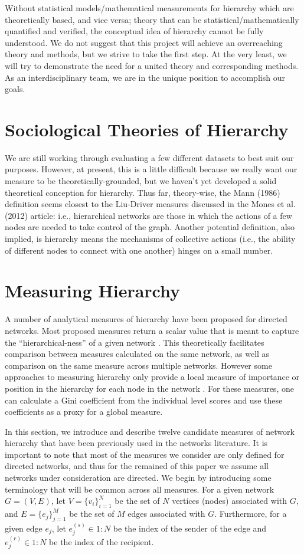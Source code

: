 \documentclass[3p,times]{elsarticle}
\begin{document}
Without statistical models/mathematical measurements for hierarchy which are theoretically based, and vice versa; theory that can be statistical/mathematically quantified and verified, the conceptual idea of hierarchy cannot be fully understood. We do not suggest that this project will achieve an overreaching theory and methods, but we strive to take the first step. At the very least, we will try to demonstrate the need for a united theory and corresponding methods. As an interdisciplinary team, we are in the unique position to accomplish our goals.
\section{Sociological Theories of Hierarchy}
	We are still working through evaluating a few different datasets to best suit our purposes. However, at present, this is a little difficult because we really want our measure to be theoretically-grounded, but we haven't yet developed a solid theoretical conception for hierarchy. Thus far, theory-wise, the Mann (1986) definition seems closest to the Liu-Driver measures discussed in the Mones et al. (2012) article: i.e., hierarchical networks are those in which the actions of a few nodes are needed to take control of the graph. Another potential definition, also implied, is hierarchy means the mechanisms of collective actions (i.e., the ability of different nodes to connect with one another) hinges on a small number.
\section{Measuring Hierarchy}
A number of analytical measures of hierarchy have been proposed for directed networks. Most proposed measures return a scalar value that is meant to capture the ``hierarchical-ness'' of a given network \cite{Mones2012, Shizuka2012, eigen, between,Kendall1940, landau, Suchecki2013a}. This theoretically facilitates comparison between measures calculated on the same network, as well as comparison on the same measure across multiple networks. However some approaches to measuring hierarchy only provide a local measure of importance or position in the hierarchy for each node in the network \cite{key}. For these measures, one can calculate a Gini coefficient \cite{Yitzhaki1979} from the individual level scores and use these coefficients as a proxy for a global measure. 

In this section, we introduce and describe twelve candidate measures of network hierarchy that have been previously used in the networks literature. It is important to note that most of the measures we consider are only defined for directed networks, and thus for the remained of this paper we assume all networks under consideration are directed. We begin by introducing some terminology that will be common across all measures. For a given network $G=(V,E)$, let $V=\{v_i\}_{i=1}^N$ be the set of $N$ vertices (nodes) associated with $G$, and $E=\{e_j\}_{j=1}^M$ be the set of $M$ edges associated with $G$. Furthermore, for a given edge $e_j$, let $e_j^{(s)} \in 1:N$ be the index of the sender of the edge and $e_j^{(r)} \in 1:N$ be the index of the recipient. 
\end{document}
